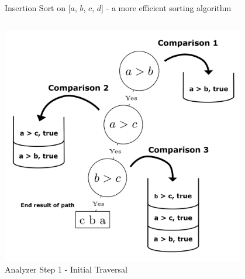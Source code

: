 \documentclass[final]{beamer}
\newlength{\onecolwid}
\newlength{\twocolwid}
\newlength{\onecolwidmid}
\begin{document}
\begin{frame}[t]
\begin{columns}[t]
\begin{column}{\twocolwid}
\begin{figure}
\resizebox{0.9\linewidth}{!}{}
\caption{Insertion Sort on [$a$, $b$, $c$, $d$] - a more efficient sorting algorithm}
\end{figure}


\begin{columns}[t,totalwidth=\twocolwid] %

\begin{column}{\onecolwidmid} %


\begin{figure}
\includegraphics[width=0.8\linewidth]{figures/bubble_sort_step_1_formatted.png}
\caption{Analyzer Step 1 - Initial Traversal}
\label{analyzer:1}
\end{figure}


\end{column} %

\begin{column}{\onecolwidmid} %


\end{column}
\end{columns}
\end{column}
\end{columns}
\end{frame}
\end{document}
